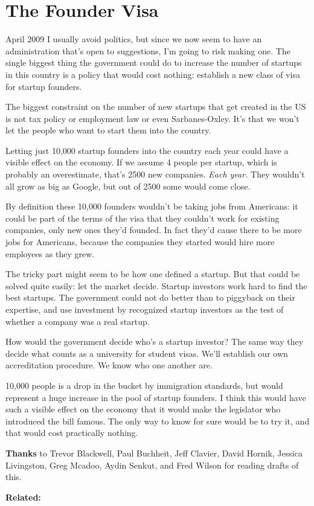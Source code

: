 \chapter{The Founder Visa}


April 2009
I usually avoid politics, but since we now seem to have an administration that's open to suggestions, I'm going to risk making one.  The single biggest thing the government could do to increase the number of startups in this country is a policy that would cost nothing: establish a new class of visa for startup founders.

The biggest constraint on the number of new startups that get created in the US is not tax policy or employment law or even Sarbanes-Oxley.  It's that we won't let the people who want to start them into the country.

Letting just 10,000 startup founders into the country each year could have a visible effect on the economy.  If we assume 4 people per startup, which is probably an overestimate, that's 2500 new companies.  \emph{Each year.}  They wouldn't all grow as big as Google, but out of 2500 some would come close.

By definition these 10,000 founders wouldn't be taking jobs from Americans: it could be part of the terms of the visa that they couldn't work for existing companies, only new ones they'd founded.  In fact they'd cause there to be 
more jobs for Americans, because the companies they started would hire more employees as they grew.

The tricky part might seem to be how one defined a startup. But that could be solved quite easily: let the market decide.  Startup investors work hard to find the best startups.  The government could not do better than to piggyback on their expertise, and use investment by recognized startup investors as the test of whether a company was a real startup.

How would the government decide who's a startup investor?  The same way they decide what counts as a university for student visas. We'll establish our own accreditation procedure. We know who one another are.

10,000 people is a drop in the bucket by immigration standards, but would represent a huge increase in the pool of startup founders.  I think this would have such a visible effect on the economy that it would make the legislator who introduced the bill famous.  The only way to know for sure would be to try it, and that would cost practically nothing.






\textbf{Thanks} to Trevor Blackwell, Paul Buchheit, Jeff Clavier, David Hornik, Jessica Livingston, Greg Mcadoo, Aydin Senkut, and Fred Wilson for reading drafts of this.



\textbf{Related:}


